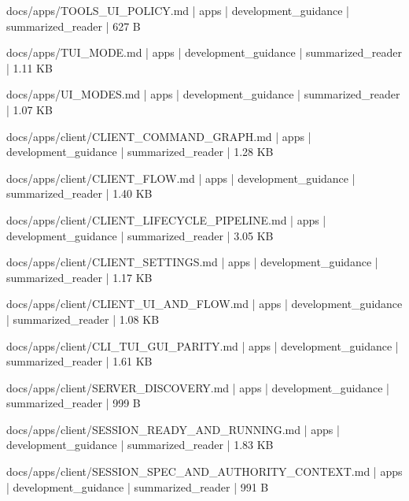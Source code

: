 \documentclass[11pt,a4paper]{report}
\begin{document}
{\small\ttfamily\raggedright docs/\allowbreak{}apps/\allowbreak{}TOOLS\_UI\_POLICY.\allowbreak{}md | apps | development\_guidance | summarized\_reader | 627 B\par}
{\small\ttfamily\raggedright docs/\allowbreak{}apps/\allowbreak{}TUI\_MODE.\allowbreak{}md | apps | development\_guidance | summarized\_reader | 1.\allowbreak{}11 KB\par}
{\small\ttfamily\raggedright docs/\allowbreak{}apps/\allowbreak{}UI\_MODES.\allowbreak{}md | apps | development\_guidance | summarized\_reader | 1.\allowbreak{}07 KB\par}
{\small\ttfamily\raggedright docs/\allowbreak{}apps/\allowbreak{}client/\allowbreak{}CLIENT\_COMMAND\_GRAPH.\allowbreak{}md | apps | development\_guidance | summarized\_reader | 1.\allowbreak{}28 KB\par}
{\small\ttfamily\raggedright docs/\allowbreak{}apps/\allowbreak{}client/\allowbreak{}CLIENT\_FLOW.\allowbreak{}md | apps | development\_guidance | summarized\_reader | 1.\allowbreak{}40 KB\par}
{\small\ttfamily\raggedright docs/\allowbreak{}apps/\allowbreak{}client/\allowbreak{}CLIENT\_LIFECYCLE\_PIPELINE.\allowbreak{}md | apps | development\_guidance | summarized\_reader | 3.\allowbreak{}05 KB\par}
{\small\ttfamily\raggedright docs/\allowbreak{}apps/\allowbreak{}client/\allowbreak{}CLIENT\_SETTINGS.\allowbreak{}md | apps | development\_guidance | summarized\_reader | 1.\allowbreak{}17 KB\par}
{\small\ttfamily\raggedright docs/\allowbreak{}apps/\allowbreak{}client/\allowbreak{}CLIENT\_UI\_AND\_FLOW.\allowbreak{}md | apps | development\_guidance | summarized\_reader | 1.\allowbreak{}08 KB\par}
{\small\ttfamily\raggedright docs/\allowbreak{}apps/\allowbreak{}client/\allowbreak{}CLI\_TUI\_GUI\_PARITY.\allowbreak{}md | apps | development\_guidance | summarized\_reader | 1.\allowbreak{}61 KB\par}
{\small\ttfamily\raggedright docs/\allowbreak{}apps/\allowbreak{}client/\allowbreak{}SERVER\_DISCOVERY.\allowbreak{}md | apps | development\_guidance | summarized\_reader | 999 B\par}
{\small\ttfamily\raggedright docs/\allowbreak{}apps/\allowbreak{}client/\allowbreak{}SESSION\_READY\_AND\_RUNNING.\allowbreak{}md | apps | development\_guidance | summarized\_reader | 1.\allowbreak{}83 KB\par}
{\small\ttfamily\raggedright docs/\allowbreak{}apps/\allowbreak{}client/\allowbreak{}SESSION\_SPEC\_AND\_AUTHORITY\_CONTEXT.\allowbreak{}md | apps | development\_guidance | summarized\_reader | 991 B\par}
\end{document}
